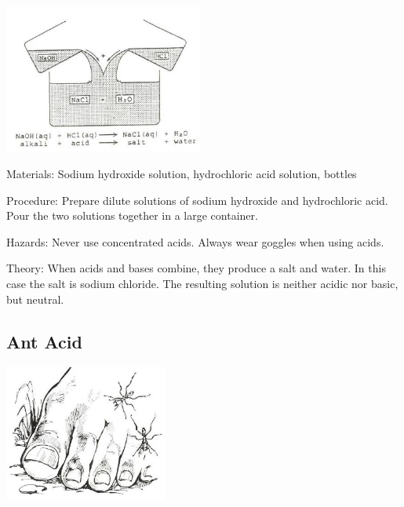 \begin{multicols}{2}
\begin{center}
\includegraphics[width=0.49\textwidth]{./img/source/neutralisation.jpg}
\end{center}

\begin{description*}
\item[Materials:]{Sodium hydroxide solution, hydrochloric acid solution, bottles}
\item[Procedure:]{Prepare dilute solutions of sodium hydroxide and hydrochloric acid. Pour the two solutions together in a large container.}
\item[Hazards:]{Never use concentrated acids. Always wear goggles when using acids.}
\item[Theory:]{When acids and bases combine, they produce a salt and water. In this case the salt is sodium chloride. The resulting solution is neither acidic nor basic, but neutral.}
\end{description*}

\subsection{Ant Acid}

\begin{center}
\includegraphics[width=0.4\textwidth]{./img/source/ant-acid.jpg}
\end{center}


\end{multicols}
